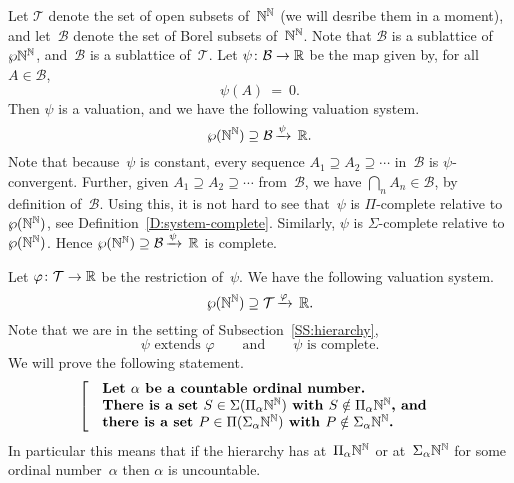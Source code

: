 \documentclass[main.tex]{subfiles}
\begin{document}
Let $\mathcal{T}$
denote the set of open subsets of~$\mathbb{N}^{\mathbb{N}}$
(we will desribe them in a moment),
and let~$\mathcal{B}$
denote the set of Borel subsets of~$\mathbb{N}^{\mathbb{N}}$.
Note that $\mathcal{B}$
is a sublattice of~$\wp{\mathbb{N}^{\mathbb{N}}}$,
and~$\mathcal{B}$ is a sublattice of~$\mathcal{T}$.
Let $\psi\colon \mathcal{B}\rightarrow \mathbb{R}$
be the map given by, for all~$A\in \mathcal{B}$,
\begin{equation*}
\psi(A)\ =\ 0.
\end{equation*}
Then $\psi$ is a valuation,
and we have the following valuation system.
\begin{equation*}
\wp(\mathbb{N}^{\mathbb{N}}) \supseteq \mathcal{B}\,\smash{\xrightarrow{\psi}\,\mathbb{R}}.
\end{equation*}
Note that because~$\psi$ is constant,
every sequence $A_1 \supseteq A_2 \supseteq \dotsb$
in~$\mathcal{B}$ is $\psi$-convergent.
Further,
given $A_1 \supseteq A_2 \supseteq \dotsb$
from~$\mathcal{B}$,
we have  $\bigcap_n A_n \in \mathcal{B}$, by definition of~$\mathcal{B}$.
Using this,
it is not hard to see that~$\psi$ is $\Pi$-complete
relative to~$\wp(\mathbb{N}^{\mathbb{N}})$,
see Definition~\ref{D:system-complete}.
Similarly, $\psi$ is $\Sigma$-complete relative to~$\wp(\mathbb{N}^{\mathbb{N}})$.
Hence
$\wp(\mathbb{N}^{\mathbb{N}}) \supseteq \mathcal{B}\,\smash{\xrightarrow{\psi}\,\mathbb{R}}$
is complete.

Let $\varphi\colon \mathcal{T}\rightarrow \mathbb{R}$
be the restriction of~$\psi$.
We have the following valuation system.
\begin{equation*}
\wp(\mathbb{N}^{\mathbb{N}}) \supseteq \mathcal{T}\,\smash{\xrightarrow{\varphi}\,\mathbb{R}}.
\end{equation*}
Note that we are in the setting of Subsection~\ref{SS:hierarchy},
\begin{equation*}
\text{$\psi$ extends $\varphi$}
\qquad\text{and}\qquad
\text{$\psi$ is complete}.
\end{equation*}
We will prove the following statement.
\begin{equation}
\label{eq:hierarchy-theorem}
\left[\quad
\begin{minipage}{.7\columnwidth}
\textbf{%
Let~$\alpha$ be a countable ordinal number.\\
There is a set~$S\in \Sigma(\Pi_\alpha\N^\N)$
with $S\notin \Pi_\alpha\N^\N$, and \\
there is a set $P\in\Pi(\Sigma_\alpha\N^\N)$
with $P\notin \Sigma_\alpha\N^\N$.}
\end{minipage}
\right.
\end{equation}
In particular
this means that if the hierarchy has
at~$\Pi_\alpha\mathbb{N}^{\mathbb{N}}$
or at~$\Sigma_\alpha\mathbb{N}^{\mathbb{N}}$
for some ordinal number~$\alpha$
then $\alpha$ is uncountable.
\end{document}
